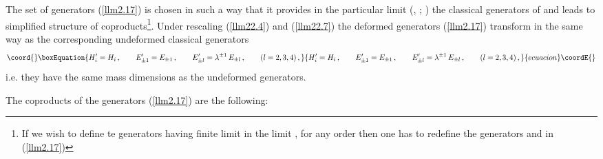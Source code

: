 \documentclass[a4paper,12pt,showkeys]{article}
\begin{document}
The set of generators (\ref{llm2.17}) is chosen in such a way that
it provides in the  particular limit (\coordHE{}, \coordHE{};
\coordHE{}) the classical generators of \coordHE{}
and leads to simplified structure of coproducts\footnote{If we
wish to define te generators having finite limit in  the limit
\coordHE{}, \coordHE{} for any order then one has to redefine
the generators \coordHE{} and \coordHE{} in (\ref{llm2.17}) }.
Under   rescaling (\ref{llm22.4}) and (\ref{llm22.7}) the deformed
generators (\ref{llm2.17}) transform in the same way as the
corresponding undeformed  classical generators
\begin{equation}\coord{}\boxEquation{\label{llm22.18}
  H'_{i} = H_i \, , \qquad E'_{\pm1} = E_{\pm1} \, , \qquad E'_{\pm l}
  = \lambda^{\pm 1} \, E_{\pm l} \, , \qquad (l =2,3,4)\, ,
}{H'_{i} = H_i \, , \qquad E'_{\pm1} = E_{\pm1} \, , \qquad E'_{\pm l}
  = \lambda^{\pm 1} \, E_{\pm l} \, , \qquad (l =2,3,4)\, ,
}{ecuacion}\coordE{}\end{equation}
i.e. they have the same mass dimensions as the undeformed generators.

 The coproducts of the
 generators (\ref{llm2.17}) are the following:
\end{document}
